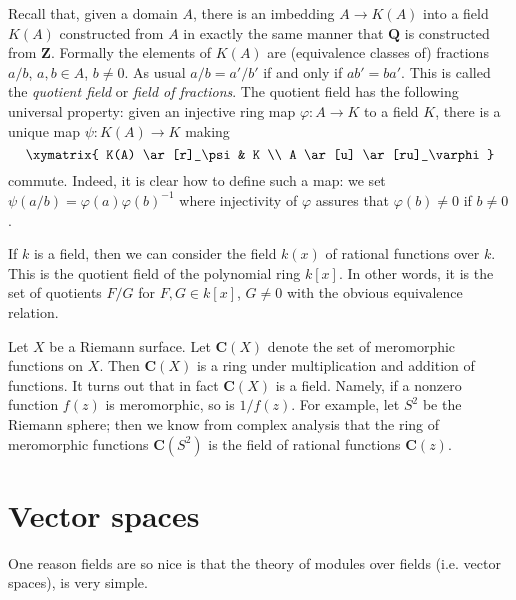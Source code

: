 \begin{example}
\label{example-quotient-field}
Recall that, given a domain $A$, there is an imbedding $A \to K(A)$ into a
field $K(A)$ constructed from $A$ in exactly the same manner that
$\mathbf{Q}$ is constructed from $\mathbf{Z}$. Formally the elements
of $K(A)$ are (equivalence classes of) fractions $a/b$,
$a, b \in A$, $b \not = 0$. As usual $a/b = a'/b'$ if and only if $ab' = ba'$.
This is called the {\it quotient field} or {\it field of fractions}.
The quotient field has the following universal property: given an
injective ring map $\varphi : A \to K$ to a field $K$, there is a unique
map $\psi: K(A) \to K$ making
$$
\xymatrix{
K(A) \ar[r]_\psi & K \\
A \ar[u] \ar[ru]_\varphi
}
$$
commute. Indeed, it is clear how to define such a map: we set
$\psi(a/b) = \varphi(a)\varphi(b)^{-1}$ where injectivity of $\varphi$
assures that $\varphi(b) \not = 0$ if $ b \not = 0$.
\end{example}

\begin{example}
\label{example-field-of-rational-functions}
If $k$ is a field, then we can consider the field $k(x)$ of rational
functions over $k$. This is the quotient field of the polynomial ring
$k[x]$. In other words, it is the set of quotients $F/G$ for
$F, G \in k[x]$, $G \not = 0$ with the obvious equivalence relation.
\end{example}

\begin{example}
\label{example-field-of-meromorphic-functions}
Let $X$ be a Riemann surface. Let $\mathbf{C}(X)$ denote the
set of meromorphic functions on $X$. Then $\mathbf{C}(X)$ is a ring under
multiplication and addition of functions. It turns out that in fact
$\mathbf{C}(X)$ is a field. Namely, if a nonzero function $f(z)$ is
meromorphic, so is $1/f(z)$. For example, let $S^2$ be the Riemann
sphere; then we know from complex analysis that the ring of meromorphic
functions $\mathbf{C}(S^2)$ is the field of rational functions $\mathbf{C}(z)$.
\end{example}



\section{Vector spaces}
\label{section-vector-spaces}

\noindent
One reason fields are so nice is that the theory of modules over fields
(i.e. vector spaces), is very simple.

